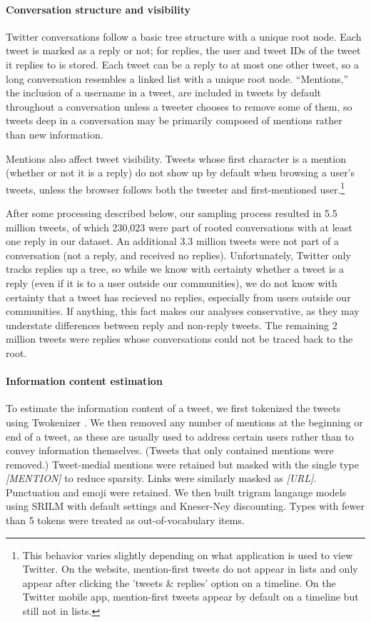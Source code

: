 \documentclass[11pt,letterpaper]{article}
\begin{document}
\paragraph{Conversation structure and visibility}\label{sect:conversation}

Twitter conversations follow a basic tree structure with a unique root node. Each tweet is marked as a reply or not; for replies, the user and tweet IDs of the tweet it replies to is stored. Each tweet can be a reply to at most one other tweet, so a long conversation resembles a linked list with a unique root node. ``Mentions,'' the inclusion of a username in a tweet, are included in tweets by default throughout a conversation unless a tweeter chooses to remove some of them, so tweets deep in a conversation may be primarily composed of mentions rather than new information.

Mentions also affect tweet visibility.  Tweets whose first character is a mention (whether or not it is a reply) do not show up by default when browsing a user's tweets, unless the browser follows both the tweeter and first-mentioned user.\footnote{This behavior varies slightly depending on what application is used to view Twitter.  On the website, mention-first tweets do not appear in lists and only appear after clicking the 'tweets \& replies' option on a timeline. On the Twitter mobile app, mention-first tweets appear by default on a timeline but still not in lists.}

After some processing described below, our sampling process resulted in 5.5 million tweets, of which 230,023 were part of rooted conversations with at least one reply in our dataset. An additional 3.3 million tweets were not part of a conversation (not a reply, and received no replies).  Unfortunately, Twitter only tracks replies up a tree, so while we know with certainty whether a tweet is a reply (even if it is to a user outside our communities), we do not know with certainty that a tweet has recieved no replies, especially from users outside our communities. If anything, this fact makes our analyses conservative, as they may understate differences between reply and non-reply tweets. The remaining 2 million tweets were replies whose conversations could not be traced back to the root.

\paragraph{Information content estimation}

To estimate the information content of a tweet, we first tokenized the tweets using Twokenizer \cite{owoputi2013}. We then removed any number of mentions at the beginning or end of a tweet, as these are usually used to address certain users rather than to convey information themselves. (Tweets that only contained mentions were removed.)  Tweet-medial mentions were retained but masked with the single type {\it [MENTION]} to reduce sparsity. Links were similarly masked as {\it [URL]}. Punctuation and emoji were retained. We then built trigram langauge models using SRILM with default settings and Kneser-Ney discounting.  Types with fewer than 5 tokens were treated as out-of-vocabulary items. 
\end{document}
